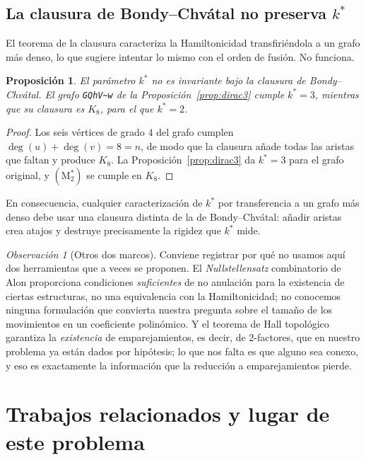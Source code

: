 \documentclass[11pt,a4paper]{article}
\newtheorem{proposicion}[teorema]{Proposición}
\theoremstyle{definition}
\theoremstyle{remark}
\newtheorem{observacion}[teorema]{Observación}
\begin{document}
\subsection{La clausura de Bondy--Chvátal no preserva $k^*$}

El teorema de la clausura \cite{bondychvatal} caracteriza la Hamiltonicidad transfiriéndola a un grafo más denso, lo que sugiere intentar lo mismo con el orden de fusión. No funciona.

\begin{proposicion}\label{prop:clausura}
El parámetro $k^*$ no es invariante bajo la clausura de Bondy--Chvátal. El grafo \verb|GQhV~w| de la Proposición~\ref{prop:dirac3} cumple $k^*=3$, mientras que su clausura es $K_8$, para el que $k^*=2$.
\end{proposicion}

\begin{proof}
Los seis vértices de grado $4$ del grafo cumplen $\deg(u)+\deg(v)=8=n$, de modo que la clausura añade todas las aristas que faltan y produce $K_8$. La Proposición~\ref{prop:dirac3} da $k^*=3$ para el grafo original, y $(\mathrm{M}^*_2)$ se cumple en $K_8$.
\end{proof}

En consecuencia, cualquier caracterización de $k^*$ por transferencia a un grafo más denso debe usar una clausura distinta de la de Bondy--Chvátal: añadir aristas crea atajos y destruye precisamente la rigidez que $k^*$ mide.

\begin{observacion}[Otros dos marcos]
Conviene registrar por qué no usamos aquí dos herramientas que a veces se proponen. El \emph{Nullstellensatz} combinatorio de Alon proporciona condiciones \emph{suficientes} de no anulación para la existencia de ciertas estructuras, no una equivalencia con la Hamiltonicidad; no conocemos ninguna formulación que convierta nuestra pregunta sobre el tamaño de los movimientos en un coeficiente polinómico. Y el teorema de Hall topológico \cite{aharoni,meshulam} garantiza la \emph{existencia} de emparejamientos, es decir, de 2-factores, que en nuestro problema ya están dados por hipótesis; lo que nos falta es que alguno sea conexo, y eso es exactamente la información que la reducción a emparejamientos pierde.
\end{observacion}



\section{Trabajos relacionados y lugar de este problema}\label{sec:relacionados}
\end{document}
